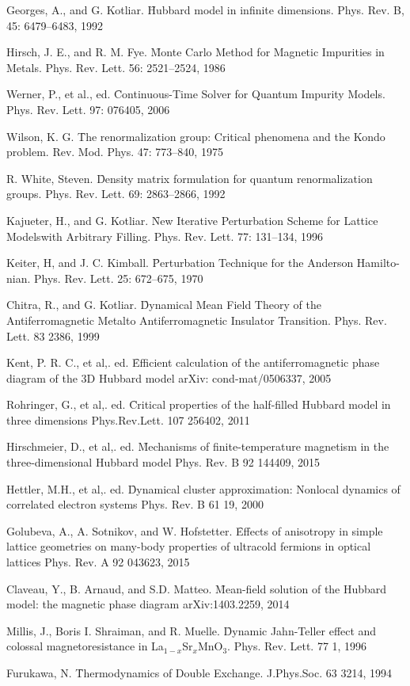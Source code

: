 \begin{thebibliography}{4}
{Georges, A., and G. Kotliar. \f{Hubbard model in infinite dimensions.} Phys. Rev. B, 45: 6479–6483, 1992}

{Hirsch, J. E., and R. M. Fye. \f{Monte Carlo Method for Magnetic Impurities in Metals.} Phys. Rev. Lett. 56: 2521–2524, 1986}

{Werner, P., et al., ed. \f{Continuous-Time Solver for Quantum Impurity Models.} Phys. Rev. Lett. 97: 076405, 2006 }

{Wilson, K. G. \f{The renormalization group: Critical phenomena and the Kondo problem.} Rev. Mod. Phys. 47: 773–840, 1975}

{R. White, Steven. \f{Density matrix formulation for quantum renormalization groups.} Phys. Rev. Lett. 69: 2863–2866, 1992}

{Kajueter, H., and G. Kotliar. \f{New Iterative Perturbation Scheme for Lattice Modelswith Arbitrary Filling.} Phys. Rev. Lett. 77: 131–134, 1996}

{Keiter, H, and J. C. Kimball. \f{Perturbation Technique for the Anderson Hamilto-nian.} Phys. Rev. Lett. 25: 672–675, 1970}

{Chitra, R., and G. Kotliar. \f{Dynamical Mean Field Theory of the Antiferromagnetic Metalto Antiferromagnetic Insulator Transition.} Phys. Rev. Lett. 83 2386, 1999}

{Kent, P. R. C., et al,. ed. \f{Efficient calculation of the antiferromagnetic phase diagram of the 3D Hubbard model} arXiv: cond-mat/0506337, 2005}

{Rohringer, G., et al,. ed. \f{Critical properties of the half-filled Hubbard model in three dimensions} Phys.Rev.Lett. 107 256402, 2011}

{Hirschmeier, D., et al,. ed. \f{Mechanisms of finite-temperature magnetism in the three-dimensional Hubbard model} Phys. Rev. B 92 144409, 2015}

{Hettler, M.H., et al,. ed. \f{Dynamical cluster approximation: Nonlocal dynamics of correlated electron systems} Phys. Rev. B 61 19, 2000}

{Golubeva, A., A. Sotnikov, and W. Hofstetter. \f{Effects of anisotropy in simple lattice geometries on many-body properties of ultracold fermions in optical lattices} Phys. Rev. A 92 043623, 2015} 

{Claveau, Y., B. Arnaud, and S.D. Matteo. \f{Mean-field solution of the Hubbard model: the magnetic phase diagram} arXiv:1403.2259, 2014}

{Millis, J., Boris I. Shraiman, and R. Muelle. \f{Dynamic Jahn-Teller effect and colossal magnetoresistance in La$_{1-x}$Sr$_x$MnO$_3$.} Phys. Rev. Lett. 77 1, 1996}

{Furukawa, N. \f{Thermodynamics of Double Exchange.} J.Phys.Soc. 63 3214, 1994}

\end{thebibliography}

